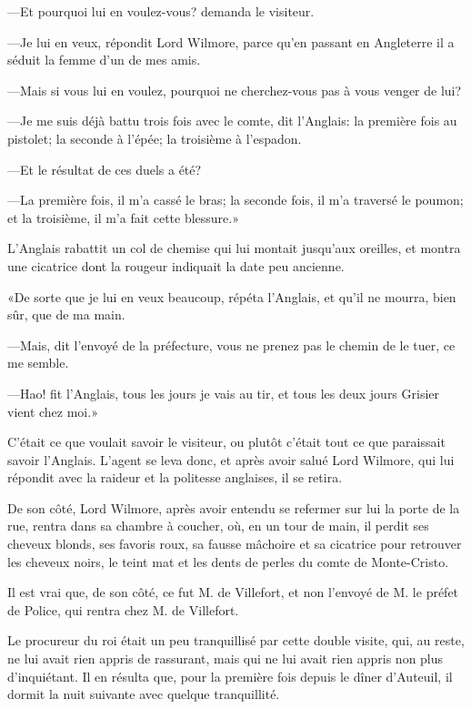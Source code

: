 —Et pourquoi lui en voulez-vous? demanda le visiteur. 

—Je lui en veux, répondit Lord Wilmore, parce qu'en passant en Angleterre il a séduit la femme d'un de mes amis. 

—Mais si vous lui en voulez, pourquoi ne cherchez-vous pas à vous venger de lui? 

—Je me suis déjà battu trois fois avec le comte, dit l'Anglais: la première fois au pistolet; la seconde à l'épée; la troisième à l'espadon. 

—Et le résultat de ces duels a été? 

—La première fois, il m'a cassé le bras; la seconde fois, il m'a traversé le poumon; et la troisième, il m'a fait cette blessure.» 

L'Anglais rabattit un col de chemise qui lui montait jusqu'aux oreilles, et montra une cicatrice dont la rougeur indiquait la date peu ancienne. 

«De sorte que je lui en veux beaucoup, répéta l'Anglais, et qu'il ne mourra, bien sûr, que de ma main.  

—Mais, dit l'envoyé de la préfecture, vous ne prenez pas le chemin de le tuer, ce me semble. 

—Hao! fit l'Anglais, tous les jours je vais au tir, et tous les deux jours Grisier vient chez moi.» 

C'était ce que voulait savoir le visiteur, ou plutôt c'était tout ce que paraissait savoir l'Anglais. L'agent se leva donc, et après avoir salué Lord Wilmore, qui lui répondit avec la raideur et la politesse anglaises, il se retira. 

De son côté, Lord Wilmore, après avoir entendu se refermer sur lui la porte de la rue, rentra dans sa chambre à coucher, où, en un tour de main, il perdit ses cheveux blonds, ses favoris roux, sa fausse mâchoire et sa cicatrice pour retrouver les cheveux noirs, le teint mat et les dents de perles du comte de Monte-Cristo. 

Il est vrai que, de son côté, ce fut M. de Villefort, et non l'envoyé de M. le préfet de Police, qui rentra chez M. de Villefort. 

Le procureur du roi était un peu tranquillisé par cette double visite, qui, au reste, ne lui avait rien appris de rassurant, mais qui ne lui avait rien appris non plus d'inquiétant. Il en résulta que, pour la première fois depuis le dîner d'Auteuil, il dormit la nuit suivante avec quelque tranquillité. 